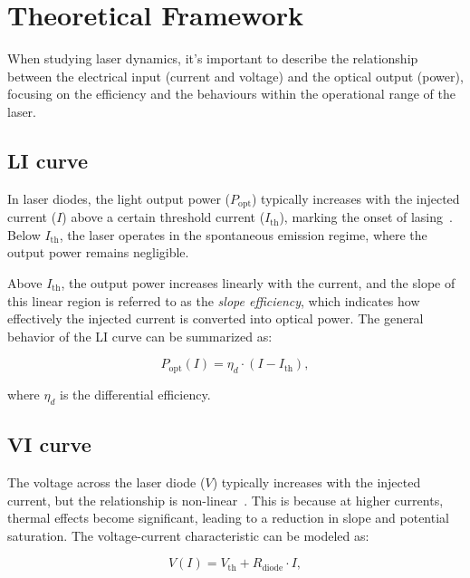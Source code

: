 \documentclass[prl,twocolumn]{revtex4-1}
\begin{document}
\section{Theoretical Framework}

When studying laser dynamics, it's important to describe the relationship between the electrical input (current and voltage) and the optical output (power), focusing on the efficiency and the behaviours within the operational range of the laser.

\subsection{LI curve}

In laser diodes, the light output power (\(P_{\text{opt}}\)) typically increases with the injected current (\(I\)) above a certain threshold current (\(I_{\text{th}}\)), marking the onset of lasing~\cite{pap1}. Below \(I_{\text{th}}\), the laser operates in the spontaneous emission regime, where the output power remains negligible.

Above \(I_{\text{th}}\), the output power increases linearly with the current, and the slope of this linear region is referred to as the \textit{slope efficiency}, which indicates how effectively the injected current is converted into optical power. The general behavior of the LI curve can be summarized as:

\begin{equation}
\label{eq:fit_LI_curve}
P_{\text{opt}}(I) = \eta_d \cdot (I - I_{\text{th}}),
\end{equation}

where \(\eta_d\) is the differential efficiency.

\subsection{VI curve}

The voltage across the laser diode (\(V\)) typically increases with the injected current, but the relationship is non-linear~\cite{pap1}. This is because at higher currents, thermal effects become significant, leading to a reduction in slope and potential saturation. The voltage-current characteristic can be modeled as:

\begin{equation}
\label{eq:fit_VI_curve}
V(I) = V_{\text{th}} + R_{\text{diode}} \cdot I,
\end{equation}
\end{document}
